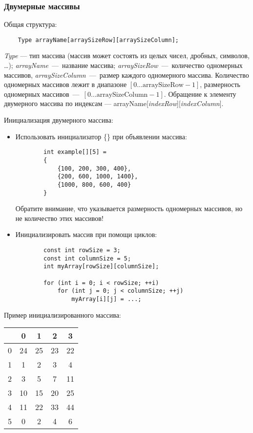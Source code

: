 \subsubsection{Двумерные массивы}
Общая структура:
\begin{lstlisting}
    Type arrayName[arraySizeRow][arraySizeColumn];
\end{lstlisting}

\textit{Type} --- тип массива (массив может состоять из целых чисел, дробных, символов, \ldots); \textit{arrayName}~---~название массива; \textit{arraySizeRow}~---~количество одномерных массивов, \textit{arraySizeColumn}~---~размер каждого одномерного массива. Количество одномерных массивов лежит в диапазоне $\left[ 0 \ldots \text{arraySizeRow} - 1 \right]$, размерность одномерных массивов~---~$\left[ 0 \ldots \text{arraySizeColumn} - 1 \right]$. Обращение к элементу двумерного массива по индексам --- arrayName[\textit{indexRow}][\textit{indexColumn}].

Инициализация двумерного массива:
\begin{itemize}
    \item Использовать инициализатор \{\} при объявлении массива:
    \begin{lstlisting}
        int example[][5] = 
        {
            {100, 200, 300, 400},
            {200, 600, 1000, 1400},
            {1000, 800, 600, 400}
        }
    \end{lstlisting}
    
    Обратите внимание, что указывается размерность одномерных массивов, но не количество этих массивов!
    
    \item Инициализировать массив при помощи циклов:
    \begin{lstlisting}
        const int rowSize = 3;
        const int columnSize = 5;
        int myArray[rowSize][columnSize];

        for (int i = 0; i < rowSize; ++i)
            for (int j = 0; j < columnSize; ++j)
                myArray[i][j] = ...;    
    \end{lstlisting}
\end{itemize}

Пример инициализированного массива:

\begin{tabular}{|c|c|c|c|c|}
    \hline
      & 0 & 1 & 2 & 3 \\
    \hline
    0 & 24 & 25 & 23 & 22 \\
    \hline
    1 & 1 & 2 & 3 & 4 \\
    \hline
    2 & 3 & 5 & 7 & 11 \\
    \hline
    3 & 10 & 15 & 20 & 25 \\
    \hline
    4 & 11 & 22 & 33 & 44 \\
    \hline
    5 & 0 & 2 & 4 & 6 \\
    \hline
\end{tabular}